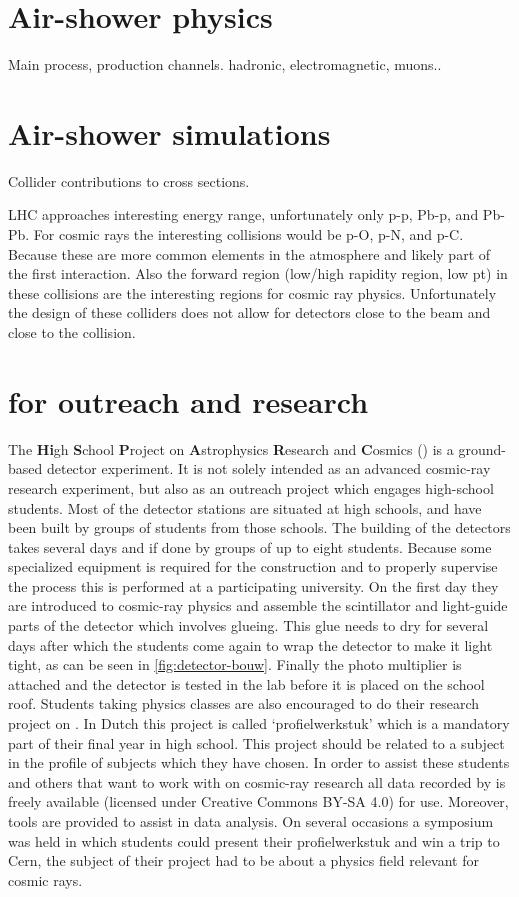 \section{Air-shower physics}

Main process, production channels. hadronic, electromagnetic, muons..


\section{Air-shower simulations}

Collider contributions to cross sections.

LHC approaches interesting energy range, unfortunately only p-p, Pb-p, and Pb-Pb. For cosmic rays the interesting collisions would be p-O, p-N, and p-C. Because these are more common elements in the atmosphere and likely part of the first interaction. Also the forward region (low/high rapidity region, low pt) in these collisions are the interesting regions for cosmic ray physics. Unfortunately the design of these colliders does not allow for detectors close to the beam and close to the collision.


\section{\hisparc for outreach and research}

The \textbf{Hi}gh \textbf{S}chool \textbf{P}roject on \textbf{A}strophysics \textbf{R}esearch and \textbf{C}osmics (\hisparc) is a ground-based detector experiment. It is not solely intended as an advanced cosmic-ray research experiment, but also as an outreach project which engages high-school students. Most of the \hisparc detector stations are situated at high schools, and have been built by groups of students from those schools. The building of the detectors takes several days and if done by groups of up to eight students. Because some specialized equipment is required for the construction and to properly supervise the process this is performed at a participating university. On the first day they are introduced to cosmic-ray physics and assemble the scintillator and light-guide parts of the detector which involves glueing. This glue needs to dry for several days after which the students come again to wrap the detector to make it light tight, as can be seen in \cref{fig:detector-bouw}. Finally the photo multiplier is attached and the detector is tested in the lab before it is placed on the school roof. Students taking physics classes are also encouraged to do their research project on \hisparc. In Dutch this project is called `profielwerkstuk' which is a mandatory part of their final year in high school. This project should be related to a subject in the profile of subjects which they have chosen. In order to assist these students and others that want to work with on cosmic-ray research all data recorded by \hisparc is freely available (licensed under Creative Commons BY-SA 4.0) for use. Moreover, tools are provided to assist in data analysis. On several occasions a symposium was held in which students could present their profielwerkstuk and win a trip to Cern, the subject of their project had to be about a physics field relevant for cosmic rays.

